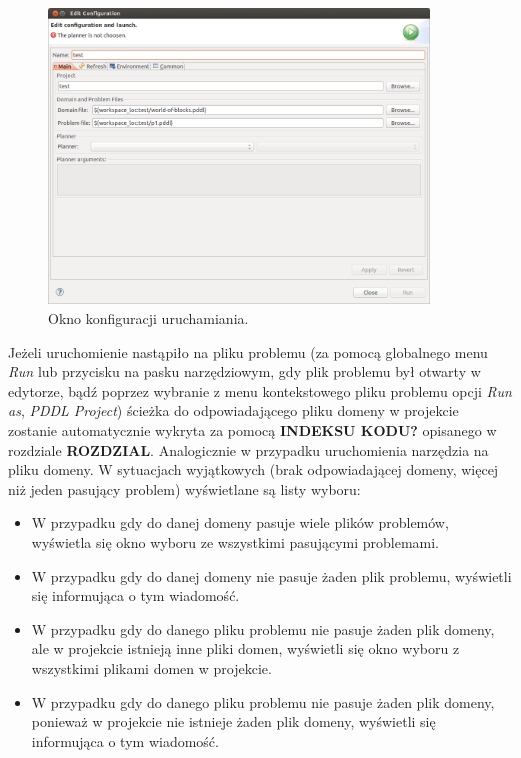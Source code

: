 \begin{figure}[h!]
    \centering
    \includegraphics[width=0.9\textwidth]{img/run_configuration_window}
    \caption{Okno konfiguracji uruchamiania.}
    \label{fig:run_configuration_window}
\end{figure}

Jeżeli uruchomienie nastąpiło na pliku problemu (za pomocą globalnego menu \textit{Run} lub przycisku na pasku narzędziowym, gdy plik problemu był otwarty w edytorze, bądź poprzez wybranie z menu kontekstowego pliku problemu opcji \textit{Run as}, \textit{PDDL Project}) ścieżka do odpowiadającego pliku domeny w projekcie zostanie automatycznie wykryta za pomocą \textbf{INDEKSU KODU?} opisanego w rozdziale \textbf{ROZDZIAL}. Analogicznie w przypadku uruchomienia narzędzia na pliku domeny. W sytuacjach wyjątkowych (brak odpowiadającej domeny, więcej niż jeden pasujący problem) wyświetlane są listy wyboru:
\begin{itemize}
\item W przypadku gdy do danej domeny pasuje wiele plików problemów, wyświetla się okno wyboru ze wszystkimi pasującymi problemami.
\item W przypadku gdy do danej domeny nie pasuje żaden plik problemu, wyświetli się informująca o tym wiadomość.
\item W przypadku gdy do danego pliku problemu nie pasuje żaden plik domeny, ale w projekcie istnieją inne pliki domen, wyświetli się okno wyboru z wszystkimi plikami domen w projekcie.
\item W przypadku gdy do danego pliku problemu nie pasuje żaden plik domeny, ponieważ w projekcie nie istnieje żaden plik domeny, wyświetli się informująca o tym wiadomość.
\end{itemize}

